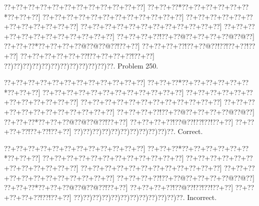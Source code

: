 \documentclass[a5paper]{article}
\begin{document}
\newpage
\begin{center}
{\goo
\0??+\0??+\0??+\0??+\0??+\0??+\0??+\0??+\0??+\0??+\0??+\0??]
\0??+\0??+\0??*\0??+\0??+\0??+\0??+\0??+\0??*\0??+\0??+\0??]
\0??+\0??+\0??+\0??+\0??+\0??+\0??+\0??+\0??+\0??+\0??+\0??]
\0??+\0??+\0??+\0??+\0??+\0??+\0??+\0??+\0??+\0??+\0??+\0??]
\0??+\0??+\0??+\0??+\0??+\0??+\0??+\0??+\0??+\0??+\0??+\0??]
\0??+\0??+\0??+\0??+\0??+\0??+\0??+\0??+\0??+\0??+\0??+\0??]
\0??+\0??+\0??+\0??!\0??+\0??@\0??+\0??+\0??+\0??@\0??@\0??]
\0??+\0??+\0??*\0??+\0??+\0??+\0??@\0??@\0??@\0??!\0??+\0??]
\0??+\0??+\0??+\0??!\0??+\0??@\0??!\0??!\0??+\0??!\0??+\0??]
\0??+\0??+\0??+\0??+\0??+\0??!\0??+\0??+\0??+\0??!\0??+\0??]
\0??)\0??)\0??)\0??)\0??)\0??)\0??)\0??)\0??)\0??)\0??)\0??.
}
Problem 250.

\end{center}
\begin{center}
{\goo
\0??+\0??+\0??+\0??+\0??+\0??+\0??+\0??+\0??+\0??+\0??+\0??]
\0??+\0??+\0??*\0??+\0??+\0??+\0??+\0??+\0??*\0??+\0??+\0??]
\0??+\0??+\0??+\0??+\0??+\0??+\0??+\0??+\0??+\0??+\0??+\0??]
\0??+\0??+\0??+\0??+\0??+\0??+\0??+\0??+\0??+\0??+\0??+\0??]
\0??+\0??+\0??+\0??+\0??+\0??+\0??+\0??+\0??+\0??+\0??+\0??]
\0??+\0??+\0??+\0??+\0??+\0??+\0??+\0??+\0??+\0??+\0??+\0??]
\0??+\0??+\0??+\0??!\0??+\0??@\0??+\0??+\0??+\0??@\0??@\0??]
\0??+\0??+\0??*\0??+\0??+\0??@\0??@\0??@\0??!\0??+\0??]
\0??+\0??+\0??+\0??!\0??@\0??!\0??!\0??!\0??+\0??]
\0??+\0??+\0??+\0??!\0??+\0??!\0??+\0??]
\0??)\0??)\0??)\0??)\0??)\0??)\0??)\0??)\0??)\0??)\0??.
}
Correct. 

\end{center}
\begin{center}
{\goo
\0??+\0??+\0??+\0??+\0??+\0??+\0??+\0??+\0??+\0??+\0??+\0??]
\0??+\0??+\0??*\0??+\0??+\0??+\0??+\0??+\0??*\0??+\0??+\0??]
\0??+\0??+\0??+\0??+\0??+\0??+\0??+\0??+\0??+\0??+\0??+\0??]
\0??+\0??+\0??+\0??+\0??+\0??+\0??+\0??+\0??+\0??+\0??+\0??]
\0??+\0??+\0??+\0??+\0??+\0??+\0??+\0??+\0??+\0??+\0??+\0??]
\0??+\0??+\0??+\0??+\0??+\0??+\0??+\0??+\0??+\0??+\0??+\0??]
\0??+\0??+\0??+\0??!\0??+\0??@\0??+\0??+\0??+\0??@\0??@\0??]
\0??+\0??+\0??*\0??+\0??+\0??@\0??@\0??@\0??!\0??+\0??]
\0??+\0??+\0??+\0??!\0??@\0??!\0??!\0??!\0??+\0??]
\0??+\0??+\0??+\0??+\0??!\0??!\0??+\0??]
\0??)\0??)\0??)\0??)\0??)\0??)\0??)\0??)\0??)\0??)\0??)\0??.
}
Incorrect. 

\end{center}
\end{document}
